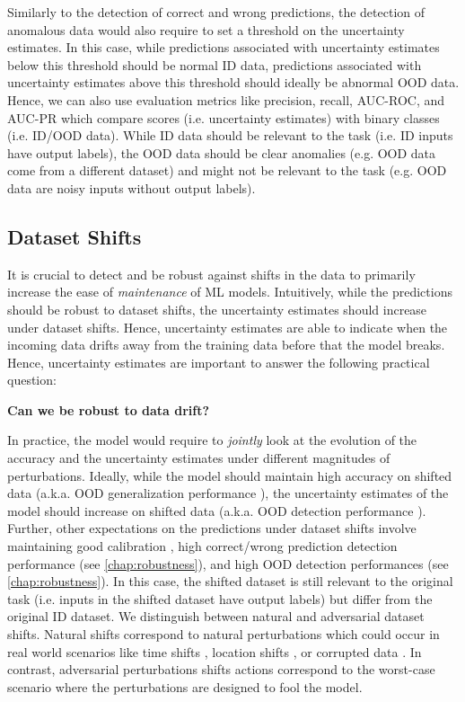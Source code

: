 Similarly to the detection of correct and wrong predictions, the detection of anomalous data would also require to set a threshold on the uncertainty estimates. In this case, while predictions associated with uncertainty estimates below this threshold should be normal ID data, predictions associated with uncertainty estimates above this threshold should ideally be abnormal OOD data. Hence, we can also use evaluation metrics like precision, recall, AUC-ROC, and AUC-PR which compare scores (i.e. uncertainty estimates) with binary classes (i.e. ID/OOD data). While ID data should be relevant to the task (i.e. ID inputs have output labels), the OOD data should be clear anomalies (e.g. OOD data come from a different dataset) and might not be relevant to the task (e.g. OOD data are noisy inputs without output labels).

\subsection{Dataset Shifts}

It is crucial to detect and be robust against shifts in the data to primarily increase the ease of \emph{maintenance} of ML models. Intuitively, while the predictions should be robust to dataset shifts, the uncertainty estimates should increase under dataset shifts. Hence, uncertainty estimates are able to indicate when the incoming data drifts away from the training data before that the model breaks. Hence, uncertainty estimates are important to answer the following practical question:

\begin{center}
    \textbf{Can we be robust to data drift?}
\end{center}

In practice, the model would require to \emph{jointly} look at the evolution of the accuracy and the uncertainty estimates under different magnitudes of perturbations. Ideally, while the model should maintain high accuracy on shifted data (a.k.a. OOD generalization performance \cite{ood-generalization-survey}), the uncertainty estimates of the model should increase on shifted data (a.k.a. OOD detection performance \cite{ood-detection-survey}). Further, other expectations on the predictions under dataset shifts involve maintaining good calibration \cite{dataset-shift}, high correct/wrong prediction detection performance (see \cref{chap:robustness}), and high OOD detection performances (see \cref{chap:robustness}). In this case, the shifted dataset is still relevant to the original task (i.e. inputs in the shifted dataset have output labels) but differ from the original ID dataset. We distinguish between natural and adversarial dataset shifts. Natural shifts correspond to natural perturbations which could occur in real world scenarios like time shifts \cite{wilds, neuhold201mapillary, shifts-dataset}, location shifts \cite{wilds, neuhold201mapillary, shifts-dataset}, or corrupted data \cite{benchmarking-corruptions, taori2020shift}. In contrast, adversarial perturbations shifts actions correspond to the worst-case scenario where the perturbations are designed to fool the model.

